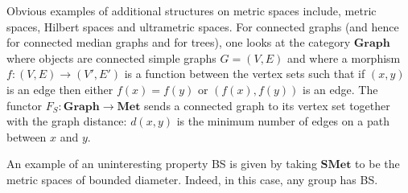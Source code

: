 \documentclass[a4paper]{article}
\theoremstyle{definition}
\newtheorem{rem}[lem]{Remark}
\begin{document}
%
%
Obvious examples of additional structures on metric spaces include, metric spaces, Hilbert spaces and ultrametric spaces.
For connected graphs (and hence for connected median graphs and for trees), one looks at the category $\mathbf{Graph}$ where objects are connected simple graphs $G=(V,E)$ and where a morphism $f\colon (V,E)\to(V',E')$ is a function between the vertex sets such that if $(x,y)$ is an edge then either $f(x)=f(y)$ or $(f(x),f(y))$ is an edge.
The functor $F_S\colon\mathbf{Graph}\to\mathbf{Met}$ sends a connected graph to its vertex set together with the graph distance: $d(x,y)$ is the minimum number of edges on a path between $x$ and $y$.


%
%
%
An example of an uninteresting property BS is given by taking $\mathbf{SMet}$ to be the metric spaces of bounded diameter. Indeed, in this case, any group has BS.
\end{document}
